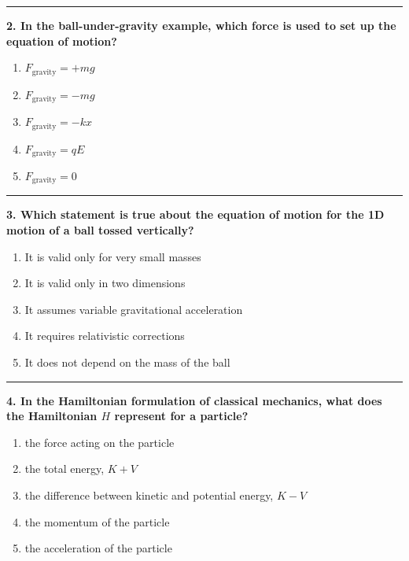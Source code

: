 \documentclass[
  english,
  9pt,
]{extbook}
\providecommand{\tightlist}{%
  \setlength{\itemsep}{0pt}\setlength{\parskip}{0pt}}
\theoremstyle{definition}
\theoremstyle{definition}
\theoremstyle{definition}
\theoremstyle{definition}
\theoremstyle{remark}
\begin{document}
\begin{center}\rule{0.5\linewidth}{0.5pt}\end{center}

\textbf{2. In the ball-under-gravity example, which force is used to set up the equation of motion?}

\begin{enumerate}
\def\labelenumi{\alph{enumi}.}
\tightlist
\item
  \(F_{\text{gravity}} = +mg\)
\item
  \(F_{\text{gravity}} = -mg\)
\item
  \(F_{\text{gravity}} = -k x\)
\item
  \(F_{\text{gravity}} = qE\)
\item
  \(F_{\text{gravity}} = 0\)
\end{enumerate}

\begin{center}\rule{0.5\linewidth}{0.5pt}\end{center}

\textbf{3. Which statement is true about the equation of motion for the 1D motion of a ball tossed vertically?}

\begin{enumerate}
\def\labelenumi{\alph{enumi}.}
\tightlist
\item
  It is valid only for very small masses\\
\item
  It is valid only in two dimensions\\
\item
  It assumes variable gravitational acceleration
\item
  It requires relativistic corrections\\
\item
  It does not depend on the mass of the ball
\end{enumerate}

\begin{center}\rule{0.5\linewidth}{0.5pt}\end{center}

\textbf{4. In the Hamiltonian formulation of classical mechanics, what does the Hamiltonian \(H\) represent for a particle?}

\begin{enumerate}
\def\labelenumi{\alph{enumi}.}
\tightlist
\item
  the force acting on the particle\\
\item
  the total energy, \(K+V\)\\
\item
  the difference between kinetic and potential energy, \(K-V\)\\
\item
  the momentum of the particle\\
\item
  the acceleration of the particle
\end{enumerate}
\end{document}
